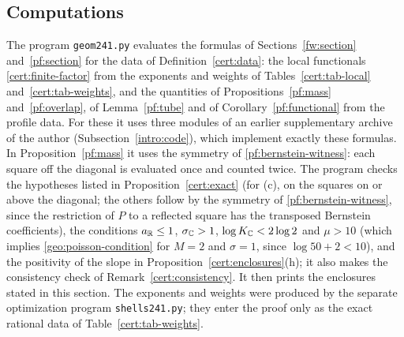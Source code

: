 \subsection{Computations}\label{cert:computations}
The program \texttt{geom241.py} evaluates the formulas of
Sections~\ref{fw:section} and~\ref{pf:section} for the data of
Definition~\ref{cert:data}: the local functionals
\eqref{cert:finite-factor} from the exponents and weights of
Tables~\ref{cert:tab-local} and~\ref{cert:tab-weights}, and the
quantities of Propositions~\ref{pf:mass} and~\ref{pf:overlap}, of
Lemma~\ref{pf:tube} and of Corollary~\ref{pf:functional} from the
profile data. For these it uses three modules of an earlier
supplementary archive of the author (Subsection~\ref{intro:code}), which
implement exactly these formulas. In Proposition~\ref{pf:mass} it uses
the symmetry of \eqref{pf:bernstein-witness}: each square off the
diagonal is evaluated once and counted twice. The program checks the
hypotheses listed in Proposition~\ref{cert:exact} (for (c), on the
squares on or above the diagonal; the others follow by the symmetry of
\eqref{pf:bernstein-witness}, since the restriction of $P$ to a reflected
square has the transposed Bernstein coefficients), the conditions
$a_\mathbb R\le1$, $\sigma_\mathbb C>1$, $\log K_\mathbb C<2\log2$ and $\mu>10$ (which
implies \eqref{geo:poisson-condition} for $M=2$ and $\sigma=1$, since
$\log50+2<10$), and the positivity of the slope in
Proposition~\ref{cert:enclosures}(h); it also makes the consistency
check of Remark~\ref{cert:consistency}. It then prints the enclosures
stated in this section. The exponents and weights were produced by the
separate optimization program \texttt{shells241.py}; they enter the
proof only as the exact rational data of Table~\ref{cert:tab-weights}.

